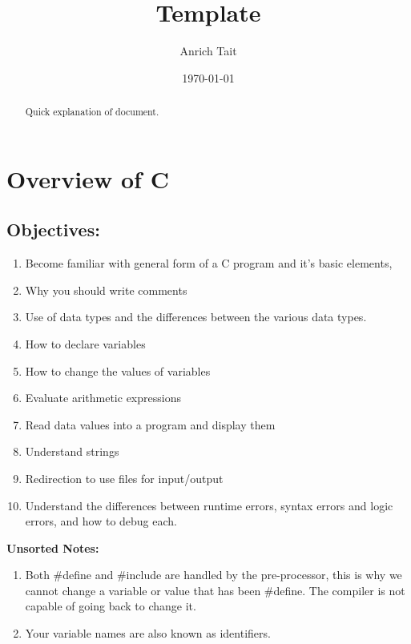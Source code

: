 \documentclass[12pt, letterpaper]{report}
\title{Template}
\author{Anrich Tait}
\date{\today}
\begin{document}
\restoregeometry %
\nopagecolor%

\begin{abstract}
	Quick explanation of document.
\end{abstract}
\tableofcontents

\chapter{Overview of C}
\section{Objectives:}
\begin{enumerate}
	\item Become familiar with general form of a C program and it's basic elements,
	\item Why you should write comments
	\item Use of data types and the differences between the various data types.
	\item How to declare variables
	\item How to change the values of variables
	\item Evaluate arithmetic expressions
	\item Read data values into a program and display them
	\item Understand strings
	\item Redirection to use files for input/output
	\item Understand the differences between runtime errors, syntax errors and logic errors, and how to debug each.
\end{enumerate}
\textbf{Unsorted Notes:}
\begin{enumerate}
	\item Both \#define and \#include are handled by the pre-processor, this is
		why we cannot change a variable or value that has been \#define. The 
		compiler is not capable of going back to change it.
	\item Your variable names are also known as identifiers.
\end{enumerate}
\end{document}
